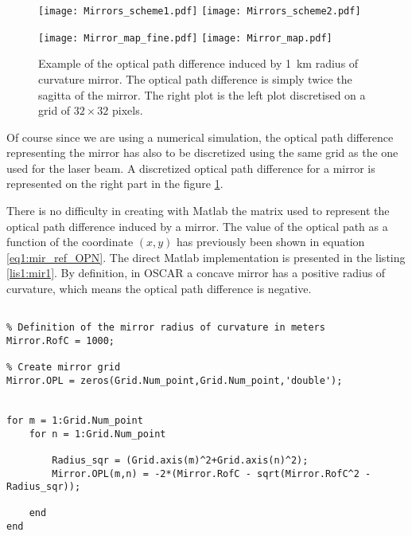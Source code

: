 \begin{figure}
\begin{center}
\texttt{[image: Mirrors\_scheme1.pdf]}\hfill
\texttt{[image: Mirrors\_scheme2.pdf]}\hfill

\vspace*{1cm}

\texttt{[image: Mirror\_map\_fine.pdf]}\hfill
\texttt{[image: Mirror\_map.pdf]}
\end{center}
\caption{\label{fig4:disct_mirror} Example of the optical path difference induced by 1~km radius of curvature mirror. The optical path difference is simply twice the sagitta of the mirror. The right plot is the left plot discretised on a grid of $32 \times 32$ pixels.}
\end{figure}

Of course since we are using a numerical simulation, the optical path difference representing the mirror has also to be discretized using the same grid as the one used for the laser beam. A discretized optical path difference for a mirror is represented on the right part in the figure \ref{fig4:disct_mirror}.

There is no difficulty in creating with Matlab the matrix used to represent the optical path difference induced by a mirror. The value of the optical path as a function of the coordinate $(x,y)$ has previously been shown in equation \ref{eq1:mir_ref_OPN}. The direct Matlab implementation is presented in the listing \ref{lis1:mir1}. By definition, in OSCAR a concave mirror has a positive radius of curvature, which means the optical path difference is negative.\\

\begin{lstlisting}[float=htp,caption=The code used to create the mirror matrix \label{lis1:mir1},frame=lines]

% Definition of the mirror radius of curvature in meters
Mirror.RofC = 1000;

% Create mirror grid
Mirror.OPL = zeros(Grid.Num_point,Grid.Num_point,'double');


for m = 1:Grid.Num_point
    for n = 1:Grid.Num_point

        Radius_sqr = (Grid.axis(m)^2+Grid.axis(n)^2);
        Mirror.OPL(m,n) = -2*(Mirror.RofC - sqrt(Mirror.RofC^2 - Radius_sqr));

    end
end
\end{lstlisting}

